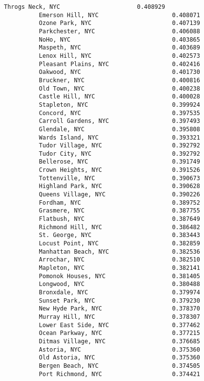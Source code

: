\documentclass[11pt]{article}
\begin{document}
\begin{Verbatim}[commandchars=\\\{\}]
          Throgs Neck, NYC                      0.408929
          Emerson Hill, NYC                     0.408071
          Ozone Park, NYC                       0.407139
          Parkchester, NYC                      0.406088
          NoHo, NYC                             0.403865
          Maspeth, NYC                          0.403689
          Lenox Hill, NYC                       0.402573
          Pleasant Plains, NYC                  0.402416
          Oakwood, NYC                          0.401730
          Bruckner, NYC                         0.400816
          Old Town, NYC                         0.400238
          Castle Hill, NYC                      0.400028
          Stapleton, NYC                        0.399924
          Concord, NYC                          0.397535
          Carroll Gardens, NYC                  0.397493
          Glendale, NYC                         0.395808
          Wards Island, NYC                     0.393321
          Tudor Village, NYC                    0.392792
          Tudor City, NYC                       0.392792
          Bellerose, NYC                        0.391749
          Crown Heights, NYC                    0.391526
          Tottenville, NYC                      0.390673
          Highland Park, NYC                    0.390628
          Queens Village, NYC                   0.390226
          Fordham, NYC                          0.389752
          Grasmere, NYC                         0.387755
          Flatbush, NYC                         0.387649
          Richmond Hill, NYC                    0.386482
          St. George, NYC                       0.383443
          Locust Point, NYC                     0.382859
          Manhattan Beach, NYC                  0.382536
          Arrochar, NYC                         0.382510
          Mapleton, NYC                         0.382141
          Pomonok Houses, NYC                   0.381405
          Longwood, NYC                         0.380488
          Bronxdale, NYC                        0.379974
          Sunset Park, NYC                      0.379230
          New Hyde Park, NYC                    0.378370
          Murray Hill, NYC                      0.378307
          Lower East Side, NYC                  0.377462
          Ocean Parkway, NYC                    0.377215
          Ditmas Village, NYC                   0.376685
          Astoria, NYC                          0.375360
          Old Astoria, NYC                      0.375360
          Bergen Beach, NYC                     0.374505
          Port Richmond, NYC                    0.374421

\end{Verbatim}
\end{document}
